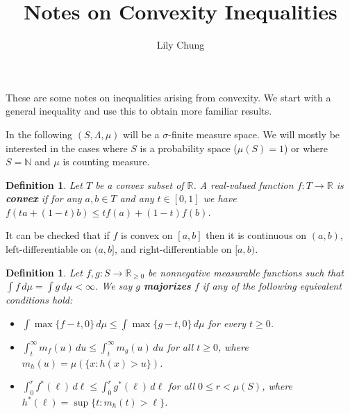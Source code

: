 \documentclass{article}
\title{Notes on Convexity Inequalities}
\author{Lily Chung}
\date{}
\newtheorem{definition}[theorem]{Definition}
\newcommand*{\defn}[1]{\textbf{#1}}
\newcommand*{\N}[0]{\mathbb{N}}
\newcommand*{\R}[0]{\mathbb{R}}
\def\[#1\]{\begin{align*}#1\end{align*}}
\begin{document}
\maketitle

These are some notes on inequalities arising from convexity.
We start with a general inequality and use this to obtain more familiar results.

In the following $(S, \Lambda, \mu)$ will be a $\sigma$-finite measure space.
We will mostly be interested in the cases where $S$ is a probability space ($\mu(S) = 1$) or where $S = \N$ and $\mu$ is counting measure.

\begin{definition}
  Let $T$ be a convex subset of $\R$.
  A real-valued function $f : T \to \R$ is \defn{convex} if for any $a, b \in T$ and any $t \in [0, 1]$ we have $f(ta + (1 - t)b) \le tf(a) + (1 - t)f(b)$.
\end{definition}

It can be checked that if $f$ is convex on $[a, b]$ then it is continuous on $(a, b)$, left-differentiable on $(a, b]$, and right-differentiable on $[a, b)$.



\begin{definition}
  Let $f, g : S \to \R_{\ge 0}$ be nonnegative measurable functions such that $\int f\,d\mu = \int g\,d\mu < \infty$.
  We say $g$ \defn{majorizes} $f$ if any of the following equivalent conditions hold:
  \begin{itemize}
  \item $\int \max\{f - t, 0\}\,d\mu \le \int \max\{g - t, 0\}\,d\mu$ for every $t \ge 0$.
  \item $\int_t^\infty m_f(u)\,du \le \int_t^\infty m_g(u)\,du$ for all $t \ge 0$, where $m_h(u) = \mu(\{x : h(x) > u\})$.
  \item $\int_0^r f^*(\ell)\,d\ell \le \int_0^r g^*(\ell)\,d\ell$ for all $0 \le r < \mu(S)$, where $h^*(\ell) = \sup\{t : m_h(t) > \ell\}$.
  \end{itemize}
\end{definition}
\end{document}
